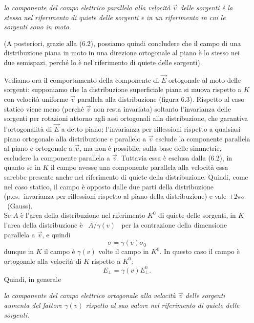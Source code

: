 \textit{la componente del campo elettrico parallela alla velocit\`a $\vec v$
delle sorgenti \`e la stessa nel riferimento di quiete delle sorgenti e in un
riferimento in cui le sorgenti sono in moto.}

(A posteriori, grazie alla (6.2), possiamo quindi concludere che il campo di una
distribuzione piana in moto in una direzione ortogonale al piano \`e lo stesso
nei due semispazi, perch\'e lo \`e nel riferimento di quiete delle sorgenti).

Vediamo ora il comportamento della componente di $\vec E$ ortogonale al moto
delle sorgenti: supponiamo che la distribuzione superficiale piana si muova
rispetto a $K$ con velocit\`a uniforme $\vec v$ parallela alla distribuzione
(figura 6.3).
Rispetto al caso statico viene meno (perch\'e $\vec v$ non resta invariata)
soltanto l'invarianza delle sorgenti per rotazioni attorno agli assi ortogonali
alla distribuzione, che garantiva l'ortogonalit\`a di $\vec E$ a detto piano;
l'invarianza per riflessioni rispetto a qualsiasi piano ortogonale alla
distribuzione e parallelo a $\vec v$ esclude la componente parallela al piano e
ortogonale a $\vec v$, ma non \`e possibile, sulla base delle simmetrie,
escludere la componente parallela a $\vec v$. Tuttavia essa \`e esclusa dalla
(6.2), in quanto se in $K$ il campo avesse una componente parallela alla
velocit\`a essa sarebbe presente anche nel riferimento di quiete della
distribuzione. Quindi, come nel caso statico, il campo \`e opposto dalle due
parti della distribuzione (p.es.\ invarianza per riflessioni rispetto al piano
della distribuzione) e vale $\pm2\pi\sigma$ \ (Gauss).\\
Se $A$ \`e l'area della distribuzione nel riferimento $K^0$ di quiete delle
sorgenti, in $K$ l'area della distribuzione \`e \ $A/\gamma(v)$ \ per la
contrazione della dimensione parallela a $\vec v$, e quindi
\begin{equation}
  \sigma=\gamma(v)\sigma_0
  \tag{6.3}
\end{equation}
dunque in $K$ il campo \`e $\gamma(v)$ volte il campo in $K^0$. In questo caso
il campo \`e ortogonale alla velocit\`a di $K$ rispetto a $K^0$:
\begin{equation}
  E_\perp=\gamma(v)E_\perp^0.
  \tag{6.4}
\end{equation}
Quindi, in generale

\textit{la componente del campo elettrico ortogonale alla velocit\`a $\vec v$
delle sorgenti aumenta del fattore $\gamma(v)$ rispetto al suo valore nel
riferimento di quiete delle sorgenti.}

